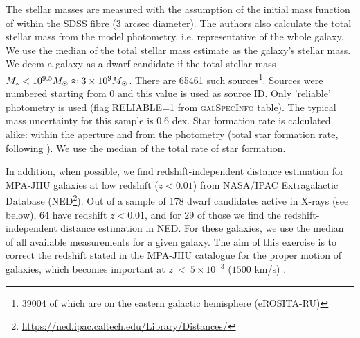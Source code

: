 \documentclass[fleqn,usenatbib]{mnras}
\newcommand{\stmass}{M_{\rm *}}
\newcommand{\msun}{M_\odot}
\newcommand{\mg}[1]{\textcolor{blue}{{MG: \bf||#1||}}}
\begin{document}
The stellar masses are measured with the assumption of the initial mass function of \citet{Kroupa2001} within the SDSS fibre (3 arcsec diameter). The authors also calculate the total stellar mass from the model photometry, i.e. representative of the whole galaxy. We use the median of the total stellar mass estimate as the galaxy's stellar mass. We deem a galaxy as a dwarf candidate if the total stellar mass $\stmass < 10^{9.5} \msun \approx 3\times 10^{9}\msun$. There are 65461 such sources\footnote{39004 of which are on the eastern galactic hemisphere (eROSITA-RU)}. Sources were numbered starting from 0 and this value is used as source ID. Only 'reliable' photometry is used (flag \textsc{RELIABLE=1} from \textsc{galSpecInfo} table). The typical mass uncertainty for this sample is 0.6 dex.  Star formation rate is calculated alike: within the aperture and from the photometry (total star formation rate, following \citealt{Salim2007}). We use the median of the total rate of star formation.



In addition, when possible, we find redshift-independent distance estimation for MPA-JHU galaxies at low redshift ($z<0.01$) from NASA/IPAC Extragalactic Database (NED\footnote{\url{https://ned.ipac.caltech.edu/Library/Distances/}}). Out of a sample of 178 dwarf candidates active in X-rays (see below), 64 have redshift $z<0.01$, and for 29 of those we find the redshift-independent distance estimation in NED. For these galaxies, we use the median of all available measurements for a given galaxy. The aim of this exercise is to correct the redshift stated in the MPA-JHU catalogue for the proper motion of galaxies, which becomes important at $z~<~5\times10^{-3}$ ($1500$ km/s) \citep{Kauffmann2003}. %
\end{document}
